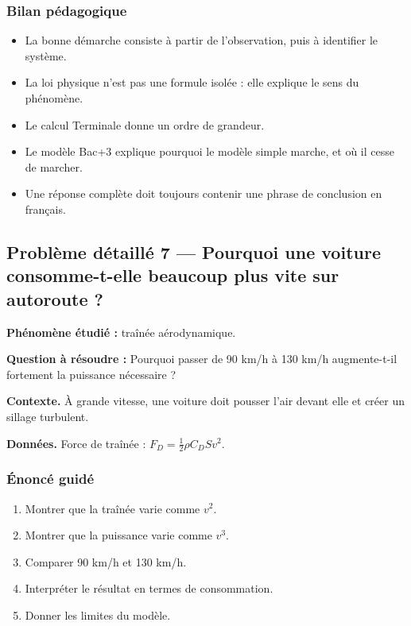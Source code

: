 \documentclass[11pt,a4paper]{article}
\begin{document}
\subsubsection*{Bilan pédagogique}

\begin{methodebox}
\begin{itemize}
  \item La bonne démarche consiste à partir de l'observation, puis à identifier le système.
  \item La loi physique n'est pas une formule isolée : elle explique le sens du phénomène.
  \item Le calcul Terminale donne un ordre de grandeur.
  \item Le modèle Bac+3 explique pourquoi le modèle simple marche, et où il cesse de marcher.
  \item Une réponse complète doit toujours contenir une phrase de conclusion en français.
\end{itemize}
\end{methodebox}

\subsection{Problème détaillé 7 — Pourquoi une voiture consomme-t-elle beaucoup plus vite sur autoroute ?}

\begin{exercicebox}
\textbf{Phénomène étudié :} traînée aérodynamique.

\medskip
\textbf{Question à résoudre :} Pourquoi passer de 90 km/h à 130 km/h augmente-t-il fortement la puissance nécessaire ?

\medskip
\textbf{Contexte.} À grande vitesse, une voiture doit pousser l'air devant elle et créer un sillage turbulent.

\medskip
\textbf{Données.} Force de traînée : \(F_D=\frac12\rho C_DS v^2\).
\end{exercicebox}

\subsubsection*{Énoncé guidé}

\begin{enumerate}
  \item Montrer que la traînée varie comme \(v^2\).
  \item Montrer que la puissance varie comme \(v^3\).
  \item Comparer 90 km/h et 130 km/h.
  \item Interpréter le résultat en termes de consommation.
  \item Donner les limites du modèle.
\end{enumerate}
\end{document}
